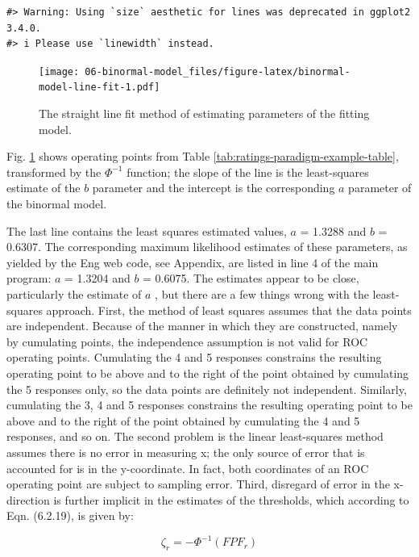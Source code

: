\documentclass[
]{book}
\begin{document}
\begin{verbatim}
#> Warning: Using `size` aesthetic for lines was deprecated in ggplot2 3.4.0.
#> i Please use `linewidth` instead.
\end{verbatim}

\begin{figure}
\centering
\texttt{[image: 06-binormal-model\_files/figure-latex/binormal-model-line-fit-1.pdf]}
\caption{\label{fig:binormal-model-line-fit}The straight line fit method of estimating parameters of the fitting model.}
\end{figure}

Fig. \ref{fig:binormal-model-line-fit} shows operating points from Table \ref{tab:ratings-paradigm-example-table}, transformed by the \(\Phi^{-1}\) function; the slope of the line is the least-squares estimate of the \(b\) parameter and the intercept is the corresponding \(a\) parameter of the binormal model.

The last line contains the least squares estimated values, \(a\) = 1.3288 and \(b\) = 0.6307. The corresponding maximum likelihood estimates of these parameters, as yielded by the Eng web code, see Appendix, are listed in line 4 of the main program: \(a\) = 1.3204 and \(b\) = 0.6075. The estimates appear to be close, particularly the estimate of \(a\) , but there are a few things wrong with the least-squares approach. First, the method of least squares assumes that the data points are independent. Because of the manner in which they are constructed, namely by cumulating points, the independence assumption is not valid for ROC operating points. Cumulating the 4 and 5 responses constrains the resulting operating point to be above and to the right of the point obtained by cumulating the 5 responses only, so the data points are definitely not independent. Similarly, cumulating the 3, 4 and 5 responses constrains the resulting operating point to be above and to the right of the point obtained by cumulating the 4 and 5 responses, and so on. The second problem is the linear least-squares method assumes there is no error in measuring x; the only source of error that is accounted for is in the y-coordinate. In fact, both coordinates of an ROC operating point are subject to sampling error. Third, disregard of error in the x-direction is further implicit in the estimates of the thresholds, which according to Eqn. (6.2.19), is given by:

\begin{equation*} 
\zeta_r = - \Phi^{-1}\left ( FPF_r \right )
\end{equation*}
\end{document}
